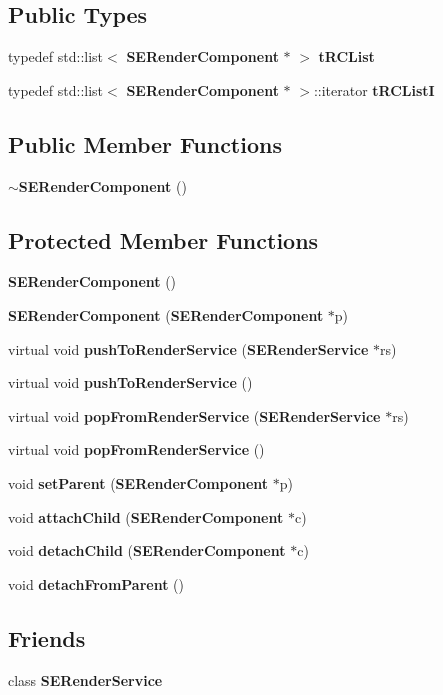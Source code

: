 \subsection*{Public Types}
\begin{DoxyCompactItemize}
\item 
typedef std\+::list$<$ {\bf S\+E\+Render\+Component} $\ast$ $>$ {\bf t\+R\+C\+List}
\item 
typedef std\+::list$<$ {\bf S\+E\+Render\+Component} $\ast$ $>$\+::iterator {\bf t\+R\+C\+List\+I}
\end{DoxyCompactItemize}
\subsection*{Public Member Functions}
\begin{DoxyCompactItemize}
\item 
{\bf $\sim$\+S\+E\+Render\+Component} ()
\end{DoxyCompactItemize}
\subsection*{Protected Member Functions}
\begin{DoxyCompactItemize}
\item 
{\bf S\+E\+Render\+Component} ()
\item 
{\bf S\+E\+Render\+Component} ({\bf S\+E\+Render\+Component} $\ast$p)
\item 
virtual void {\bf push\+To\+Render\+Service} ({\bf S\+E\+Render\+Service} $\ast$rs)
\item 
virtual void {\bf push\+To\+Render\+Service} ()
\item 
virtual void {\bf pop\+From\+Render\+Service} ({\bf S\+E\+Render\+Service} $\ast$rs)
\item 
virtual void {\bf pop\+From\+Render\+Service} ()
\item 
void {\bf set\+Parent} ({\bf S\+E\+Render\+Component} $\ast$p)
\item 
void {\bf attach\+Child} ({\bf S\+E\+Render\+Component} $\ast$c)
\item 
void {\bf detach\+Child} ({\bf S\+E\+Render\+Component} $\ast$c)
\item 
void {\bf detach\+From\+Parent} ()
\end{DoxyCompactItemize}
\subsection*{Friends}
\begin{DoxyCompactItemize}
\item 
class {\bf S\+E\+Render\+Service}
\end{DoxyCompactItemize}
